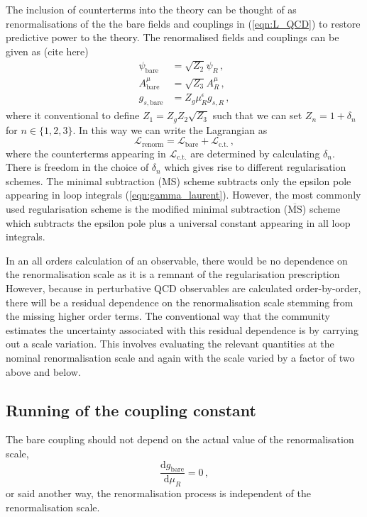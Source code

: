 \documentclass[main.tex]{subfiles}
\begin{document}
    The inclusion of counterterms into the theory can be
    thought of as renormalisations of the the bare fields
    and couplings in (\ref{eqn:L_QCD}) to restore predictive
    power to the theory. The renormalised fields and couplings
    can be given as (cite here)
    \begin{align}\label{eqn:renormlised_fields}
        \psi_{\mathrm{bare}} &= \sqrt{Z_{2}} \psi_{R} \, , \nonumber \\
        A_{\mathrm{bare}}^{\mu} &= \sqrt{Z_{3}} A_{R}^{\mu} \, ,\\
        g_{s,\mathrm{bare}} &= Z_{g} \mu_{R}^{\epsilon} g_{s,R} \, , \nonumber
    \end{align}
    where it conventional to define $Z_{1} = Z_{g}Z_{2}\sqrt{Z_{3}}$
    such that we can set $Z_{n} = 1 + \delta_{n}$ for $n \in \{1, 2, 3\}$.
    In this way we can write the Lagrangian as
    \begin{equation}
        \mathcal{L}_{\mathrm{renorm}} = \mathcal{L}_{\mathrm{bare}} + \mathcal{L}_{\mathrm{c.t.}} \, ,
    \end{equation}
    where the counterterms appearing in $\mathcal{L}_{\mathrm{c.t.}}$
    are determined by calculating $\delta_{n}$. There is freedom
    in the choice of $\delta_{n}$ which gives rise to
    different regularisation schemes. The minimal subtraction
    (MS) scheme subtracts only the epsilon pole appearing
    in loop integrals (\ref{eqn:gamma_laurent}). However, the most
    commonly used regularisation scheme is the modified minimal
    subtraction ($\overline{\mathrm{MS}}$) scheme which subtracts the
    epsilon pole plus a universal constant appearing in all
    loop integrals.

    In an all orders calculation of an observable,
    there would be no dependence on the renormalisation
    scale as it is a remnant of the regularisation prescription
    However, because in perturbative QCD observables
    are calculated order-by-order, there will be a residual
    dependence on the renormalisation scale stemming from
    the missing higher order terms. The conventional way
    that the community estimates the uncertainty associated
    with this residual dependence is by carrying out
    a scale variation. This involves evaluating the
    relevant quantities at the nominal renormalisation
    scale and again with the scale varied by a factor of
    two above and below.


\subsection{Running of the coupling constant}\label{sec:alpha_running}
    The bare coupling should not depend on the actual
    value of the renormalisation scale,
    \begin{equation}\label{eqn:d_g_bare_d_mu}
        \dfrac{\mathrm{d}g_{\mathrm{bare}}}{\mathrm{d}\mu_{R}} = 0 \, ,
    \end{equation}
    or said another way, the renormalisation process
    is independent of the renormalisation scale.
\end{document}
